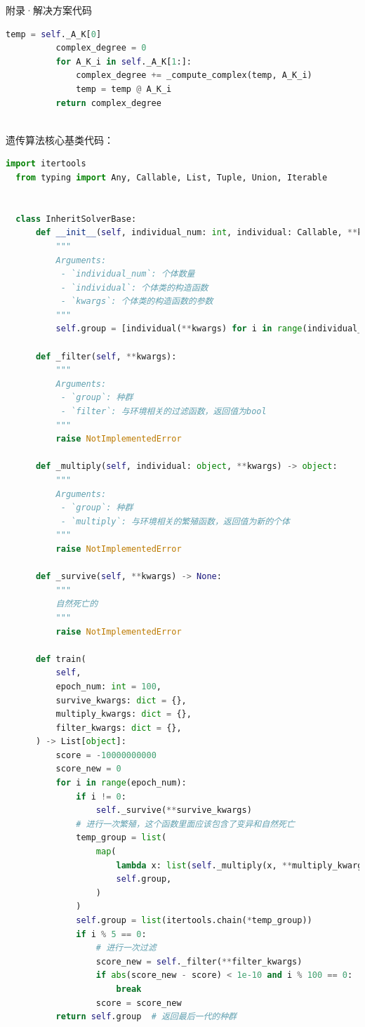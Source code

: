 \documentclass[11pt]{article}
\begin{document}
\begin{section}{附录·解决方案代码}
\begin{lstlisting}[language=Python ]
          temp = self._A_K[0]
          complex_degree = 0
          for A_K_i in self._A_K[1:]:
              complex_degree += _compute_complex(temp, A_K_i)
              temp = temp @ A_K_i
          return complex_degree
  
  \end{lstlisting}
 遗传算法核心基类代码：
 \begin{lstlisting}[language=Python]
    import itertools
  from typing import Any, Callable, List, Tuple, Union, Iterable
  
  
  class InheritSolverBase:
      def __init__(self, individual_num: int, individual: Callable, **kwargs) -> None:
          """
          Arguments:
           - `individual_num`: 个体数量
           - `individual`: 个体类的构造函数
           - `kwargs`: 个体类的构造函数的参数
          """
          self.group = [individual(**kwargs) for i in range(individual_num)]
  
      def _filter(self, **kwargs):
          """
          Arguments:
           - `group`: 种群
           - `filter`: 与环境相关的过滤函数，返回值为bool
          """
          raise NotImplementedError
  
      def _multiply(self, individual: object, **kwargs) -> object:
          """
          Arguments:
           - `group`: 种群
           - `multiply`: 与环境相关的繁殖函数，返回值为新的个体
          """
          raise NotImplementedError
  
      def _survive(self, **kwargs) -> None:
          """
          自然死亡的
          """
          raise NotImplementedError
  
      def train(
          self,
          epoch_num: int = 100,
          survive_kwargs: dict = {},
          multiply_kwargs: dict = {},
          filter_kwargs: dict = {},
      ) -> List[object]:
          score = -10000000000
          score_new = 0
          for i in range(epoch_num):
              if i != 0:
                  self._survive(**survive_kwargs)
              # 进行一次繁殖，这个函数里面应该包含了变异和自然死亡
              temp_group = list(
                  map(
                      lambda x: list(self._multiply(x, **multiply_kwargs)),
                      self.group,
                  )
              )
              self.group = list(itertools.chain(*temp_group))
              if i % 5 == 0:
                  # 进行一次过滤
                  score_new = self._filter(**filter_kwargs)
                  if abs(score_new - score) < 1e-10 and i % 100 == 0:
                      break
                  score = score_new
          return self.group  # 返回最后一代的种群
  

\end{lstlisting}
\end{section}
\end{document}
